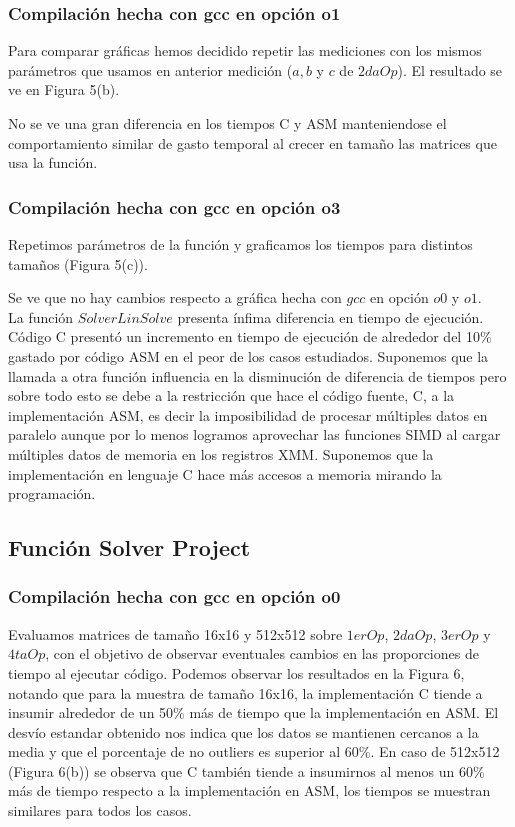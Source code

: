 \subsubsection{Compilación hecha con gcc en opción o1}
Para comparar gráficas hemos decidido repetir las mediciones con los mismos parámetros que usamos en anterior medición ($a, b$ y $c$ de $2daOp$). El resultado se ve en Figura 5(b).
 
No se ve una gran diferencia en los tiempos C y ASM manteniendose el comportamiento similar de gasto temporal al crecer en tamaño las matrices que usa la función.
  
\subsubsection{Compilación hecha con gcc en opción o3}
Repetimos parámetros de la función y graficamos los tiempos para distintos tamaños (Figura 5(c)).
 
Se ve que no hay cambios respecto a gráfica hecha con $gcc$ en opción $o0$ y $o1$. \\

La función $Solver Lin Solve$ presenta ínfima diferencia en tiempo de ejecución. Código C presentó un incremento en tiempo de ejecución de alrededor del 10$\%$ gastado por código ASM en el peor de los casos estudiados. Suponemos que la llamada a otra función influencia en la disminución de diferencia de tiempos pero sobre todo esto se debe a la restricción que hace el código fuente, C, a la implementación ASM, es decir la imposibilidad de procesar múltiples datos en paralelo aunque por lo menos logramos aprovechar las funciones SIMD al cargar múltiples datos de memoria en los registros XMM. Suponemos que la implementación en lenguaje C hace más accesos a memoria mirando la programación.

 
\subsection{Función Solver Project}

\subsubsection{Compilación hecha con gcc en opción o0} 
Evaluamos matrices de tamaño 16x16 y 512x512 sobre $1erOp$, $2daOp$, $3erOp$ y $4taOp$, con el objetivo de observar eventuales cambios en las proporciones de tiempo al ejecutar código. Podemos observar los resultados en la Figura 6, notando que para la muestra de tamaño 16x16, la implementación C tiende a insumir alrededor de un 50$\%$ más de tiempo que la implementación en ASM.
El desvío estandar obtenido nos indica que los datos se mantienen cercanos a la media y que el porcentaje de no outliers es superior al 60$\%$. En caso de 512x512 (Figura 6(b)) se observa que C también tiende a insumirnos al menos un 60$\%$ más de tiempo respecto a la implementación en ASM, los tiempos se muestran similares para todos los casos.

